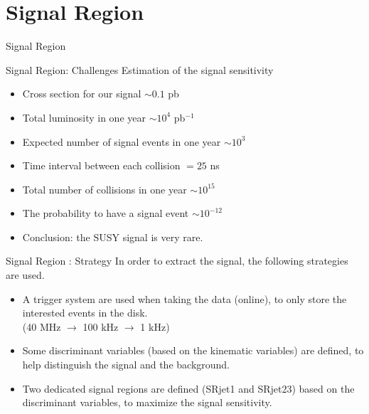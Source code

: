 \documentclass[mathserif,serif]{beamer}
\begin{document}
\section{Signal Region}
\begin{frame}
\begin{center}
\huge
Signal Region
\end{center}
\end{frame}

\begin{frame}{Signal Region: Challenges}
Estimation of the signal sensitivity
\begin{itemize}
\item Cross section for our signal $\sim 0.1$ pb
\item Total luminosity in one year $\sim 10^4$ pb$^{-1}$
\item Expected number of signal events in one year $\sim 10^3$
\end{itemize}
\begin{itemize}
\item Time interval between each collision $= 25$ ns
\item Total number of collisions in one year $\sim 10^{15}$
\item The probability to have a signal event $\sim 10^{-12}$
\item Conclusion: the SUSY signal is very rare.
\end{itemize}
\end{frame}

\begin{frame}{Signal Region : Strategy}
In order to extract the signal, the following strategies are used.
\begin{itemize}
\item A trigger system are used when taking the data (online), to only store the interested events in the disk. \\
(40 MHz $\rightarrow$ 100 kHz $\rightarrow$ 1 kHz)
\item Some discriminant variables (based on the kinematic variables) are defined, to help distinguish the signal and the background.
\item Two dedicated signal regions are defined (SRjet1 and SRjet23) based on the discriminant variables, to maximize the signal sensitivity.
\end{itemize}
\end{frame}
\end{document}
